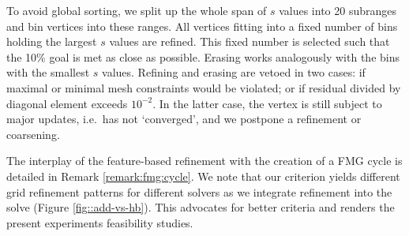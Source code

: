 To avoid global sorting, we split up the whole span of $s$
values into 20 subranges and bin vertices into these ranges.
All vertices fitting into a fixed number of bins holding the largest $s$
values are refined.
This fixed number is selected such that the 10\% goal is met as close as
possible.
Erasing works analogously with the bins with the smallest $s$ values.
Refining and erasing are vetoed in two cases:
if maximal or minimal mesh constraints would be violated;
or if residual divided by diagonal element exceeds $10^{-2}$.
In the latter case, the vertex is still subject to major updates, i.e.~has not
`converged', and we postpone a refinement or coarsening.


The interplay of the feature-based refinement with the creation of a FMG cycle
is detailed in Remark \ref{remark:fmg:cycle}.
We note that our criterion yields different grid refinement patterns
for different solvers as we integrate refinement into the solve (Figure
\ref{fig::add-vs-hb}).
This advocates for better criteria and renders the present experiments 
feasibility studies.
